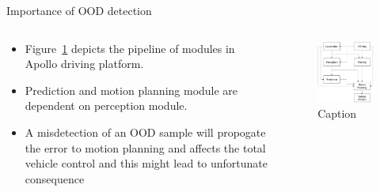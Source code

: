 \documentclass[aspectratio=169]{beamer}
\begin{document}
\begin{frame}{Importance of OOD detection}
    \begin{columns}
       \begin{column}{0.5\textwidth}
        \begin{itemize}
            \item Figure~\ref{fig:eg_apollo_pipeline} depicts the pipeline of modules in Apollo driving platform.
            \item Prediction and motion planning module are dependent on perception module.
            \item A misdetection of an OOD sample will propogate the error to motion planning and affects the total vehicle control and this might lead to unfortunate consequence
        \end{itemize}
       \end{column}
       \begin{column}{0.5\textwidth}
            \begin{figure}
                \centering
                \includegraphics[scale=0.35]{images/apollo_pipeline.jpg}
                \caption{Caption}
                \label{fig:eg_apollo_pipeline}
            \end{figure}
       \end{column}
    \end{columns}
\end{frame}
\end{document}
